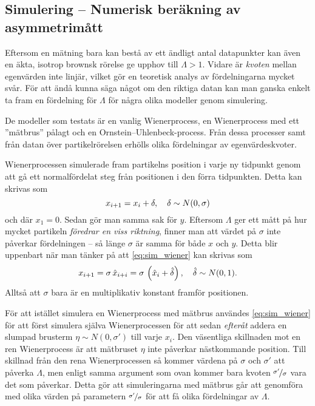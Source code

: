\subsection{Simulering -- Numerisk beräkning av asymmetrimått} %
Eftersom en mätning bara kan bestå av ett ändligt antal datapunkter kan även en äkta, isotrop brownsk rörelse ge upphov till $\varLambda>1$. Vidare är \emph{kvoten} mellan egenvärden inte linjär, vilket gör en teoretisk analys av fördelningarna mycket svår. För att ändå kunna säga något om den riktiga datan kan man ganska enkelt ta fram en fördelning för $\varLambda$ för några olika modeller genom simulering. 

De modeller som testats är en vanlig Wienerprocess, en Wienerprocess med ett ''mätbrus'' pålagt och en Ornstein–Uhlenbeck-process. Från dessa processer samt från datan över partikelrörelsen erhölls olika fördelningar av egenvärdeskvoter. 

Wienerprocessen simulerade fram partikelns position i varje ny tidpunkt genom att gå ett normalfördelat steg från positionen i den förra tidpunkten. Detta kan skrivas som
\begin{equation}\label{eq:sim_wiener}
x_{i+1} = x_i + \delta 
\qcomma  \delta \sim N(0, \sigma)
\end{equation}
och där $x_1=0$. Sedan gör man samma sak för $y$. Eftersom $\varLambda$ ger ett mått på hur mycket partikeln \emph{föredrar en viss riktning}, finner man att värdet på $\sigma$ inte påverkar fördelningen -- så länge $\sigma$ är samma för både $x$ och $y$. Detta blir uppenbart när man tänker på att \eqref{eq:sim_wiener} kan skrivas som 
\begin{equation}
x_{i+1} =\sigma\,\hat{x}_{i+i} = \sigma\,\left( \hat{x}_i + \hat{\delta} \right) 
\qcomma  \hat{\delta} \sim N(0, 1).
\end{equation}
Alltså att $\sigma$ bara är en multiplikativ konstant framför positionen.

För att istället simulera en Wienerprocess med mätbrus användes \eqref{eq:sim_wiener} för att först simulera själva Wienerprocessen för att sedan \emph{efteråt} addera en slumpad brusterm $\eta \sim N(0, \sigma')$ till varje $x_i$. Den väsentliga skillnaden mot en ren Wienerprocess är att mätbruset $\eta$ inte påverkar nästkommande position. Till skillnad från den rena Wienerprocessen så kommer värdena på $\sigma$ och $\sigma'$ att påverka $\varLambda$, men enligt samma argument som ovan kommer bara kvoten $\nicefrac{\sigma'}{\sigma}$ vara det som påverkar. Detta gör att simuleringarna med mätbrus går att genomföra med olika värden på parametern $\nicefrac{\sigma'}{\sigma}$ för att få olika fördelningar av $\varLambda$. 

